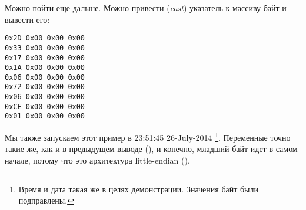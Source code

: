 Можно пойти еще дальше. Можно привести (\emph{cast}) указатель к массиву байт и вывести его:%



\begin{lstlisting}
0x2D 0x00 0x00 0x00 
0x33 0x00 0x00 0x00 
0x17 0x00 0x00 0x00 
0x1A 0x00 0x00 0x00 
0x06 0x00 0x00 0x00 
0x72 0x00 0x00 0x00 
0x06 0x00 0x00 0x00 
0xCE 0x00 0x00 0x00 
0x01 0x00 0x00 0x00 
\end{lstlisting}

Мы также запускаем этот пример в 23:51:45 26-July-2014
\footnote{Время и дата такая же в целях демонстрации. Значения байт были подправлены.}.
Переменные точно такие же, как и в предыдущем выводе 
(), и конечно, младший байт идет в самом начале, потому что это архитектура 
little-endian ().


